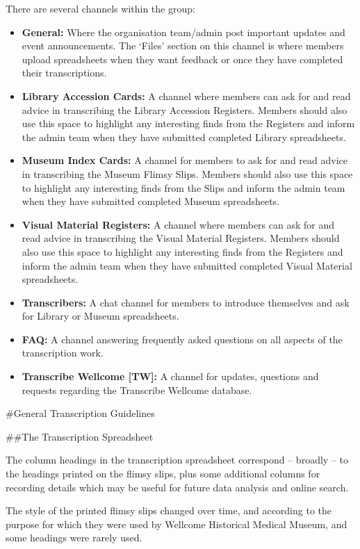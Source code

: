 \documentclass[
  openany]{book}
\begin{document}
There are several channels within the group:

\begin{itemize}
\item
  \textbf{General:} Where the organisation team/admin post important updates and event announcements. The `Files' section on this channel is where members upload spreadsheets when they want feedback or once they have completed their transcriptions.
\item
  \textbf{Library Accession Cards:} A channel where members can ask for and read advice in transcribing the Library Accession Registers. Members should also use this space to highlight any interesting finds from the Registers and inform the admin team when they have submitted completed Library spreadsheets.
\item
  \textbf{Museum Index Cards:} A channel for members to ask for and read advice in transcribing the Museum Flimsy Slips. Members should also use this space to highlight any interesting finds from the Slips and inform the admin team when they have submitted completed Museum spreadsheets.
\item
  \textbf{Visual Material Registers:} A channel where members can ask for and read advice in transcribing the Visual Material Registers. Members should also use this space to highlight any interesting finds from the Registers and inform the admin team when they have submitted completed Visual Material spreadsheets.
\item
  \textbf{Transcribers:} A chat channel for members to introduce themselves and ask for Library or Museum spreadsheets.
\item
  \textbf{FAQ:} A channel answering frequently asked questions on all aspects of the transcription work.
\item
  \textbf{Transcribe Wellcome {[}TW{]}:} A channel for updates, questions and requests regarding the Transcribe Wellcome database.
\end{itemize}

\#General Transcription Guidelines

\#\#The Transcription Spreadsheet

The column headings in the transcription spreadsheet correspond -- broadly -- to the headings printed on the flimsy slips, plus some additional columns for recording details which may be useful for future data analysis and online search.

The style of the printed flimsy slips changed over time, and according to the purpose for which they were used by Wellcome Historical Medical Museum, and some headings were rarely used.
\end{document}
